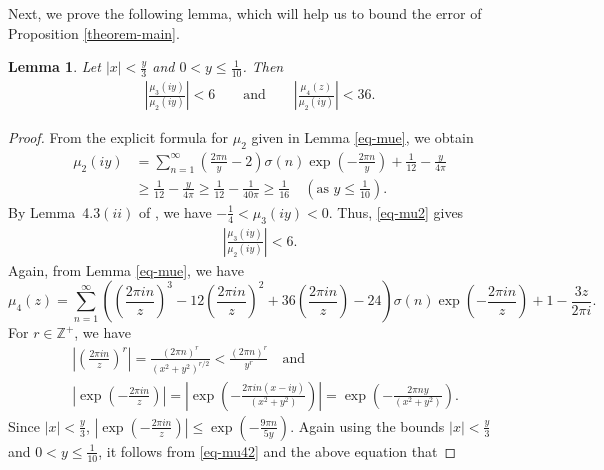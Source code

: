 \documentclass[10pt,a4paper]{amsart}
\newtheorem{lemma}[theorem]{Lemma}
\numberwithin{equation}{section}
\begin{document}
	Next, we prove the following lemma, which will help us to bound the error of Proposition \ref{theorem-main}.
	\begin{lemma}\label{lemma-mu234}
		Let $|x|<\frac{y}{3}$ and $0<y\le\frac{1}{10}$. Then
		\begin{align*}
			\left|\frac{\mu_{3}(iy)}{\mu_2(iy)}\right|<6\qquad\text{and}  \qquad\left|\frac{\mu_{4}(z)}{\mu_2(iy)}\right|<36.   
		\end{align*}
	\end{lemma}
	\begin{proof}
		From the explicit formula for $\mu_2$ given in Lemma \ref{eq-mue}, we obtain
		\begin{equation}\label{eq-mu2}
			\begin{aligned}
				\mu_{2}(iy)&=\sum_{n=1}^{\infty}\left(\frac{2\pi n}{y}-2\right)\sigma(n) \exp\left(-\frac{2\pi n}{y}\right)+\frac{1}{12}-\frac{y}{4\pi}\\
				&\ge \frac{1}{12}-\frac{y}{4\pi}\ge \frac{1}{12}-\frac{1}{40\pi}\ge \frac{1}{16}\quad\left(\text{as $y\le\frac{1}{10}$}\right).
			\end{aligned} 
		\end{equation}
		By Lemma~4.3$(ii)$ of \cite{tyler2026asymptotics}, we have $-\frac{1}{4}<\mu_3(iy)<0$. Thus, \eqref{eq-mu2} gives
		\begin{align*}
			\left|\frac{\mu_{3}(iy)}{\mu_2(iy)}\right|<6. 
		\end{align*}
		Again, from Lemma \ref{eq-mue}, we have
		\begin{equation}\label{eq-mu42}
			\mu_{4}(z)=\sum_{n=1}^{\infty}\left(\left(\frac{2\pi in}{z}\right)^{3}-12\left(\frac{2\pi in}{z}\right)^{2}+36\left(\frac{2\pi in}{z}\right)-24\right)\sigma(n)\exp\left(-\frac{2\pi in}{z}\right)+1-\frac{3z}{2\pi i}.   
		\end{equation}
		For $r\in \mathbb{Z^{+}}$, we have
		\begin{align*}
			& \left|\left(\frac{2\pi in}{z}\right)^{r}\right| =\frac{(2\pi n)^{r}}{(x^{2}+y^{2})^{r/2}}<\frac{(2\pi n)^{r}}{y^{r}} \quad \text{and}\\
			& \left|\exp\left(-\frac{2\pi in}{z}\right)\right|= \left|\exp\left(-\frac{2\pi in(x-iy)}{(x^{2}+y^{2})}\right)\right|=\exp\left(-\frac{2\pi ny}{(x^{2}+y^{2})}\right).
		\end{align*}
		Since $|x|<\frac{y}{3}$, $\left|\exp\left(-\frac{2\pi in}{z}\right)\right|\le \exp\left(-\frac{9\pi n}{5y}\right).$ Again using the bounds $|x|<\frac{y}{3}$ and $0<y\le \frac{1}{10}$, it follows from \eqref{eq-mu42} and the above equation that

\end{proof}
\end{document}
